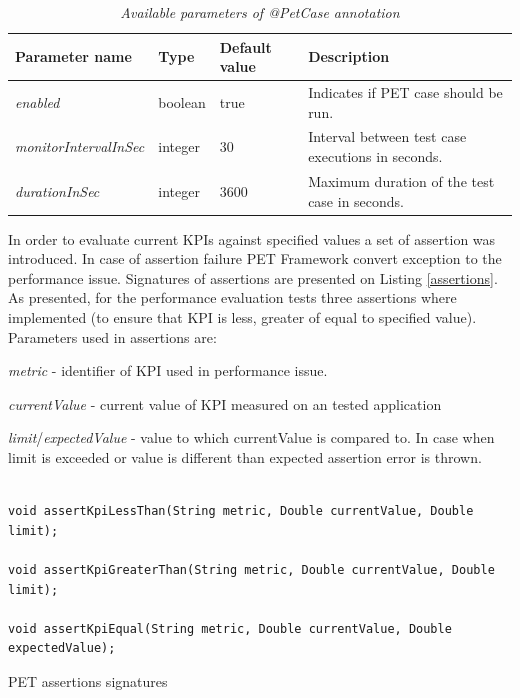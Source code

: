 \documentclass[10pt,a4paper]{article}
\let\tempone\itemize
\let\temptwo\enditemize
\renewenvironment{itemize}{\tempone\addtolength{\itemsep}{-0.4\baselineskip}}{\temptwo}
\begin{document}
\begin{table}[!htb]
\def\arraystretch{1.5}
\caption{\textit{Available parameters of @PetCase annotation}}\label{petcase}
\begin{tabularx}{\textwidth}{p{3.1cm}|p{1.3cm}|p{1.1cm}|X}
  \textbf{Parameter name} &\textbf{Type} & \textbf{Default value} & \textbf{Description} \\
\hline
			\textit{enabled} & boolean & true & Indicates if PET case should be run.\\
			\textit{monitorIntervalInSec} & integer & 30 & Interval between test case executions in seconds.\\
			\textit{durationInSec} & integer & 3600 & Maximum duration of the test case in seconds.\\
\end{tabularx}
\end{table}			

In order to evaluate current KPIs against specified values a set of assertion was introduced. In case of assertion failure PET Framework convert exception to the performance issue. Signatures of assertions are presented on Listing  \ref{assertions}. As presented, for the performance evaluation tests three assertions where implemented (to ensure that KPI is less, greater of equal to specified value).  Parameters used in assertions are: 
\begin{itemize} 
\item \textit{metric} - identifier of KPI used in performance issue.
\item \textit{currentValue} - current value of KPI measured on an tested application
\item \textit{limit}/\textit{expectedValue} - value to which currentValue is compared to. In case when limit is exceeded or value is different than expected assertion error is thrown.
\end{itemize}

\begin{listing}[ht]\begin{verbatim}

void assertKpiLessThan(String metric, Double currentValue, Double limit);

void assertKpiGreaterThan(String metric, Double currentValue, Double limit);

void assertKpiEqual(String metric, Double currentValue, Double expectedValue);
\end{verbatim}
\caption{PET assertions signatures} \label{assertions}
\end{listing}
\end{document}
